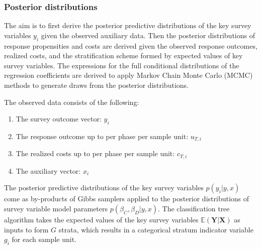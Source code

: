 \documentclass[12pt]{article}
\begin{document}




\subsubsection{Posterior distributions}
\label{subsubsec:posterior-distributions}

The aim is to first derive the posterior predictive distributions of the key survey variables $y_{i}$ given the observed auxiliary data.
Then the posterior distributions of response propensities and costs are derived given the observed response outcomes, realized costs, and the stratification scheme formed by expected values of key survey variables.
The expressions for the full conditional distributions of the regression coefficients are derived to apply Markov Chain Monte Carlo (MCMC) methods to generate draws from the posterior distributions.

The observed data consists of the following:
\begin{enumerate}
	\item The survey outcome vector: $y_i$
	\item The response outcome up to per phase per sample unit: $u_{T,i}$
	\item The realized costs up to per phase per sample unit: $c_{T,i}$
	\item The auxiliary vector: $x_i$
\end{enumerate}

The posterior predictive distributions of the key survey variables $p(y_i|y,x)$ come as by-products of Gibbs samplers applied to the posterior distributions of survey variable model parameters $p(\beta_C,\beta_D|y,x)$.
The classification tree algorithm takes the expected values of the key survey variables $\mathbb{E}(\mathbf{Y}|\mathbf{X})$ as inputs to form $G$ strata, which results in a categorical stratum indicator variable $g_i$ for each sample unit.
\end{document}
